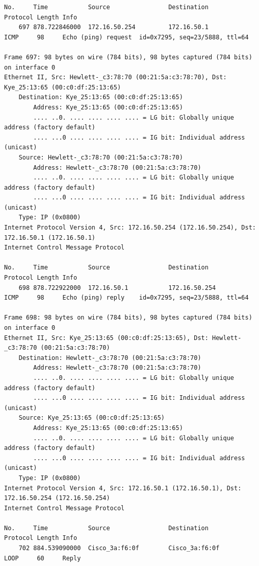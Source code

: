 \documentclass[a4paper,11pt]{article}
\begin{document}
\begin{lstlisting}
No.     Time           Source                Destination           Protocol Length Info
    697 878.722846000  172.16.50.254         172.16.50.1           ICMP     98     Echo (ping) request  id=0x7295, seq=23/5888, ttl=64

Frame 697: 98 bytes on wire (784 bits), 98 bytes captured (784 bits) on interface 0
Ethernet II, Src: Hewlett-_c3:78:70 (00:21:5a:c3:78:70), Dst: Kye_25:13:65 (00:c0:df:25:13:65)
    Destination: Kye_25:13:65 (00:c0:df:25:13:65)
        Address: Kye_25:13:65 (00:c0:df:25:13:65)
        .... ..0. .... .... .... .... = LG bit: Globally unique address (factory default)
        .... ...0 .... .... .... .... = IG bit: Individual address (unicast)
    Source: Hewlett-_c3:78:70 (00:21:5a:c3:78:70)
        Address: Hewlett-_c3:78:70 (00:21:5a:c3:78:70)
        .... ..0. .... .... .... .... = LG bit: Globally unique address (factory default)
        .... ...0 .... .... .... .... = IG bit: Individual address (unicast)
    Type: IP (0x0800)
Internet Protocol Version 4, Src: 172.16.50.254 (172.16.50.254), Dst: 172.16.50.1 (172.16.50.1)
Internet Control Message Protocol

No.     Time           Source                Destination           Protocol Length Info
    698 878.722922000  172.16.50.1           172.16.50.254         ICMP     98     Echo (ping) reply    id=0x7295, seq=23/5888, ttl=64

Frame 698: 98 bytes on wire (784 bits), 98 bytes captured (784 bits) on interface 0
Ethernet II, Src: Kye_25:13:65 (00:c0:df:25:13:65), Dst: Hewlett-_c3:78:70 (00:21:5a:c3:78:70)
    Destination: Hewlett-_c3:78:70 (00:21:5a:c3:78:70)
        Address: Hewlett-_c3:78:70 (00:21:5a:c3:78:70)
        .... ..0. .... .... .... .... = LG bit: Globally unique address (factory default)
        .... ...0 .... .... .... .... = IG bit: Individual address (unicast)
    Source: Kye_25:13:65 (00:c0:df:25:13:65)
        Address: Kye_25:13:65 (00:c0:df:25:13:65)
        .... ..0. .... .... .... .... = LG bit: Globally unique address (factory default)
        .... ...0 .... .... .... .... = IG bit: Individual address (unicast)
    Type: IP (0x0800)
Internet Protocol Version 4, Src: 172.16.50.1 (172.16.50.1), Dst: 172.16.50.254 (172.16.50.254)
Internet Control Message Protocol

No.     Time           Source                Destination           Protocol Length Info
    702 884.539090000  Cisco_3a:f6:0f        Cisco_3a:f6:0f        LOOP     60     Reply


\end{lstlisting}
\end{document}
